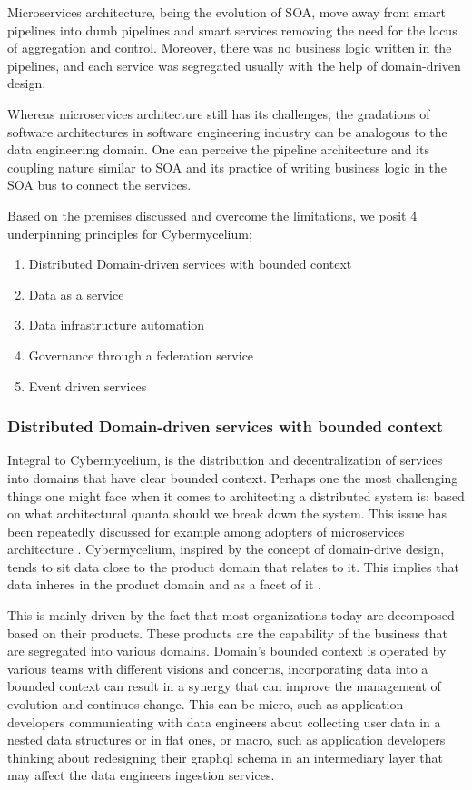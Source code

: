 \documentclass[review]{elsarticle}
\begin{document}
Microservices architecture, being the evolution of SOA, move away from smart pipelines into dumb pipelines and smart services removing the need for the locus of aggregation and control. Moreover, there was no business logic written in the pipelines, and each service was segregated usually with the help of domain-driven design.

Whereas microservices architecture still has its challenges, the gradations of software architectures in software engineering industry can be analogous to the data engineering domain. One can perceive the pipeline architecture and its coupling nature similar to SOA and its practice of writing business logic in the SOA bus to connect the services. 

Based on the premises discussed and overcome the limitations, we posit 4 underpinning principles for Cybermycelium;

\begin{enumerate}
    \item Distributed Domain-driven services with bounded context
    \item Data as a service
    \item Data infrastructure automation
    \item Governance through a federation service
    \item Event driven services
\end{enumerate}

\subsubsection{Distributed Domain-driven services with bounded context}

Integral to Cybermycelium, is the distribution and decentralization of services into domains that have clear bounded context. Perhaps one the most challenging things one might face when it comes to architecting a distributed system is: based on what architectural quanta should we break down the system. This issue has been repeatedly discussed for example among adopters of microservices architecture . Cybermycelium, inspired by the concept of domain-drive design, tends to sit data close to the product domain that relates to it. This implies that data inheres in the product domain and as a facet of it \cite{laigner2021data}.

This is mainly driven by the fact that most organizations today are decomposed based on their products. These products are the capability of the business that are segregated into various domains. Domain's bounded context is operated by various teams with different visions and concerns, incorporating data into a bounded context can result in a synergy that can improve the management of evolution and continuos change. This can be micro, such as application developers communicating with data engineers about collecting user data in a nested data structures or in flat ones, or macro, such as application developers thinking about redesigning their graphql schema in an intermediary layer that may affect the data engineers ingestion services.
\end{document}
